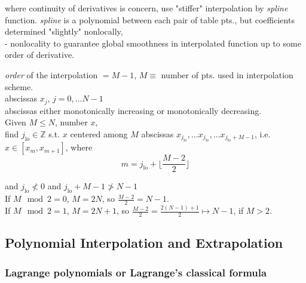 \documentclass[10pt]{amsart}
\begin{document}
\begin{multicols*}{2}
where continuity of derivatives is concern, use "stiffer" interpolation by \emph{spline} function. \emph{spline} is a polynomial between each pair of table pts., but coefficients determined "slightly" nonlocally, \\
- nonlocality to guarantee global smoothness in interpolated function up to some order of derivative.

\emph{order} of the interpolation $= M - 1$, $M \equiv $ number of pts. used in interpolation scheme. \\

abscissas $x_j$, $j=0, \dots N-1$ \\
abscissas either monotonically increasing or monotonically decreasing. \\

Given $M \leq N$, number $x$, \\
find $j_{\text{lo}} \in \mathbb{Z}$ s.t. $x$ centered among $M$ abscissas $x_{j_{\text{lo}}}, \dots x_{j_{\text{lo}} }, \dots x_{j_{\text{lo}} + M - 1}$, i.e. $x\in [ x_m, x_{m+1}]$, where
\begin{equation}
	m = j_{\text{lo}} + \lfloor \frac{M-2}{2} \rfloor
\end{equation}

and $j_{\text{lo}} \nless 0$ and $ j_{\text{lo}} + M  - 1 \ngtr N - 1$ \\

If $M \mod{2} = 0$, $M = 2N$, so $ \frac{M-2}{2} = N-1$. \\
If $M \mod{2} = 1$, $M= 2N+1$, so $ \frac{M-2}{2} = \frac{2(N-1) + 1}{2} \mapsto N-1$, if $M > 2$. \\

\subsection{Polynomial Interpolation and Extrapolation}

\subsubsection{Lagrange polynomials or Lagrange's classical formula}


\end{multicols*}
\end{document}
